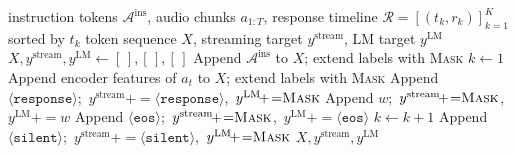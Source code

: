 \documentclass{article}
\begin{document}
\vspace{15mm}
\begin{algorithm}[H]
\caption{Streaming Sample Tokenization and Label Construction}
\label{alg:tokenize}
\begin{algorithmic}[1]
\Require instruction tokens $\mathcal{A}^{\text{ins}}$, audio chunks 
         $a_{1:T}$, response timeline 
         $\mathcal{R}=[(t_k, r_k)]_{k=1}^{K}$ sorted by $t_k$
\Ensure  token sequence $X$, streaming target $y^{\text{stream}}$, 
         LM target $y^{\text{LM}}$
\State $X, y^{\text{stream}}, y^{\text{LM}} \gets [\,],[\,],[\,]$
\State Append $\mathcal{A}^{\text{ins}}$ to $X$; extend labels with \textsc{Mask}
\State $k \gets 1$
    \State Append encoder features of $a_t$ to $X$; extend labels with \textsc{Mask}
            
        \State Append $\langle\texttt{response}\rangle$;\ 
               $y^{\text{stream}}\!{+\!=}\!\langle\texttt{response}\rangle$,\ 
               $y^{\text{LM}}\!{+\!=}\textsc{Mask}$
        \For{token $w$ in $r_k$}
            \State Append $w$;\ 
                   $y^{\text{stream}}\!{+\!=}\textsc{Mask}$,\ 
                   $y^{\text{LM}}\!{+\!=}w$
        \EndFor
        \State Append $\langle\texttt{eos}\rangle$;\ 
               $y^{\text{stream}}\!{+\!=}\textsc{Mask}$,\ 
               $y^{\text{LM}}\!{+\!=}\langle\texttt{eos}\rangle$
        \State $k \gets k+1$
    \Else                                {}
        \State Append $\langle\texttt{silent}\rangle$;\ 
               $y^{\text{stream}}\!{+\!=}\!\langle\texttt{silent}\rangle$,\ 
               $y^{\text{LM}}\!{+\!=}\textsc{Mask}$
    \EndIf
\EndFor
\State \Return $X, y^{\text{stream}}, y^{\text{LM}}$
\end{algorithmic}
\end{algorithm}

\newpage
\end{document}
